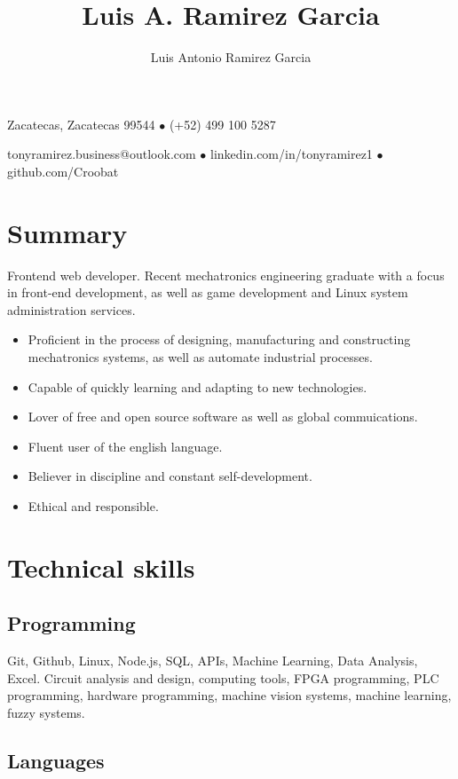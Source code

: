 \documentclass{article}
\author{Luis Antonio Ramirez Garcia}
\title{Luis A. Ramirez Garcia}
\makeatletter
\renewcommand{\maketitle}{
  \begin{center}
    {
      \huge\bfseries
      \theauthor
    }

    \vspace{1em}

    Zacatecas, Zacatecas 99544 $\bullet$ (+52) 499 100 5287

    \vspace{0.5em}

    tonyramirez.business@outlook.com $\bullet$ linkedin.com/in/tonyramirez1 $\bullet$ github.com/Croobat

    \vspace{-0.5em}

  \end{center}
}
\makeatother
\begin{document}
  \maketitle

  \section{Summary}%

  Frontend web developer. Recent mechatronics engineering graduate with a focus in front-end development, as well as game development and Linux system administration services.

  \begin{itemize}
    \item Proficient in the process of designing, manufacturing and constructing mechatronics systems, as well as automate industrial processes.

    \item Capable of quickly learning and adapting to new technologies.

    \item Lover of free and open source software as well as global commuications.

    \item Fluent user of the english language.

    \item Believer in discipline and constant self-development.

    \item Ethical and responsible.
  \end{itemize}%


  \section{Technical skills}%

  \subsection{Programming}

  Git, Github, Linux, Node.js, SQL, APIs, Machine Learning, Data Analysis, Excel. Circuit analysis and design, computing tools, FPGA programming, PLC programming,  hardware programming, machine vision systems, machine learning, fuzzy systems.

    \subsection{Languages}
\end{document}
